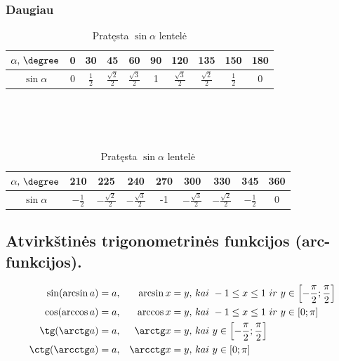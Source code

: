 \subsubsection{Daugiau}

\begin{table}[h]
    \begin{tabular}{|c|ccccccccc|} 
        \hline
        $\alpha,\,\degree$ & 0 & 30 & 45 & 60 & 90 & 120 & 135 & 150 & 180 \\ 
        \hline
        $\sin \alpha$ & 0 & $\frac{1}{2}$ & $\frac{\sqrt{2}}{2}$ & $\frac{\sqrt{3}}{2}$ & 1 
                      & $\frac{\sqrt{3}}{2}$ & $\frac{\sqrt{2}}{2}$ & $\frac{1}{2}$ & 0 \\
        \hline
    \end{tabular}
    \\ \\ \\
    \begin{tabular}{|c|cccccccc|}
        \hline
        $\alpha,\,\degree$ & 210 & 225 & 240 & 270 & 300 & 330 & 345 & 360 \\ 
        \hline
        $\sin \alpha$ & $-\frac{1}{2}$ & $-\frac{\sqrt{2}}{2}$ & $-\frac{\sqrt{3}}{2}$ & -1
                      & $-\frac{\sqrt{3}}{2}$ & $-\frac{\sqrt{2}}{2}$ & $-\frac{1}{2}$ & 0 \\
        \hline
    \end{tabular}
    \caption{Pratęsta $\sin \alpha$ lentelė}
\end{table}


\subsection{Atvirkštinės trigonometrinės funkcijos (arc-funkcijos).}

\begin{equation}
    \begin{aligned}[c]
        \sin(\arcsin a) &= a, & \arcsin x &= y,\,kai\ -1 \le x \le 1\ ir\ y \in \left[ -\frac{\pi}{2}; \frac{\pi}{2}\right] \\
        \cos(\arccos a) &= a, & \arccos x &= y,\,kai\ -1 \le x \le 1\ ir\ y \in \left[0;\pi\right] \\
        \tg (\arctg  a) &= a, & \arctg  x &= y,\,kai\ y \in \left[ -\frac{\pi}{2}; \frac{\pi}{2}\right]\\
        \ctg(\arcctg a) &= a, & \arcctg x &= y,\,kai\ y \in \left[0;\pi\right]
    \end{aligned}
\end{equation}

